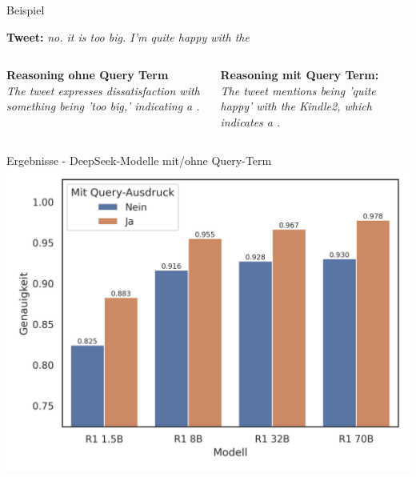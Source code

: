 \documentclass[aspectratio=169]{beamer} %
\begin{document}
\begin{frame}{Beispiel}
\begin{center}
    \textbf{Tweet:} \glqq \textit{no. it is too big. I'm quite happy with the \grqq}
    \vspace{0.45cm}
    \begin{columns}
        \begin{column}{0.45\textwidth}
            \textbf{Reasoning ohne Query Term} \\
            \vspace{0.4cm}
            \glqq \textit{The tweet expresses dissatisfaction with something being 'too big,' indicating a .\grqq}
        \end{column}
        \begin{column}{0.45\textwidth}
            \textbf{Reasoning mit Query Term:} \\
            \vspace{0.4cm}
            \glqq \textit{The tweet mentions being 'quite happy' with the Kindle2, which indicates a .\grqq}
        \end{column}
    \end{columns}
\end{center}

\end{frame}

\begin{frame}{Ergebnisse - DeepSeek-Modelle mit/ohne Query-Term}
    \centering
    \includegraphics[scale=0.65]{../datasets/sentiment140/results/plots/deepseek-genauigkeit-deepseek-modelle-einfluss-query-ausdruck-truncated-y-axis.png}
\end{frame}
\end{document}
